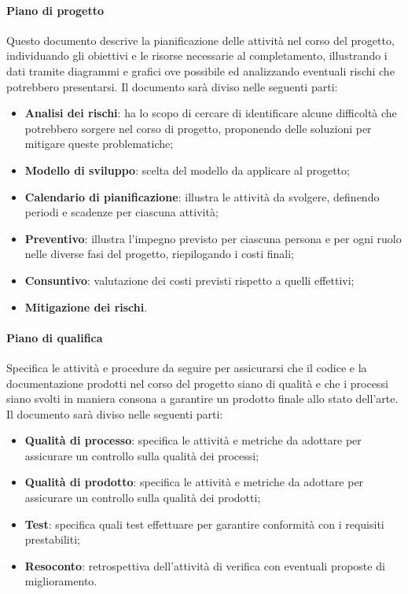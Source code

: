 \paragraph{Piano di progetto}      %
Questo documento descrive la pianificazione delle attività nel corso del progetto, individuando gli obiettivi e le risorse necessarie al completamento, illustrando i dati tramite diagrammi e grafici ove possibile ed analizzando eventuali rischi che potrebbero presentarsi.
Il documento sarà diviso nelle seguenti parti:
\begin{itemize}
    \item \textbf{Analisi dei rischi}: ha lo scopo di cercare di identificare alcune difficoltà che potrebbero sorgere nel corso di progetto, proponendo delle soluzioni per mitigare queste problematiche;
    \item \textbf{Modello di sviluppo}: scelta del modello da applicare al progetto;
    \item \textbf{Calendario di pianificazione}: illustra le attività da svolgere, definendo periodi e scadenze per ciascuna attività;
    \item \textbf{Preventivo}: illustra l'impegno previsto per ciascuna persona e per ogni ruolo nelle diverse fasi del progetto, riepilogando i costi finali;
    \item \textbf{Consuntivo}: valutazione dei costi previsti rispetto a quelli effettivi;
    \item \textbf{Mitigazione dei rischi}.
\end{itemize}

\paragraph{Piano di qualifica} %
Specifica le attività e procedure da seguire per assicurarsi che il codice e la documentazione prodotti nel corso del progetto siano di qualità e che i processi siano svolti in maniera consona a garantire un prodotto finale allo stato dell'arte.
Il documento sarà diviso nelle seguenti parti:
\begin{itemize}
    \item \textbf{Qualità di processo}: specifica le attività e metriche da adottare per assicurare un controllo sulla qualità dei processi;
    \item \textbf{Qualità di prodotto}: specifica le attività e metriche da adottare per assicurare un controllo sulla qualità dei prodotti;
    \item \textbf{Test}: specifica quali test effettuare per garantire conformità con i requisiti prestabiliti;
    \item \textbf{Resoconto}: retrospettiva dell'attività di verifica con eventuali proposte di miglioramento.
\end{itemize}


